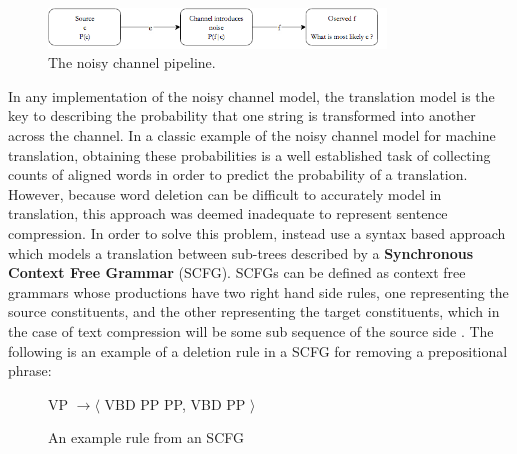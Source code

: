 \begin{figure}[H]
\centering
\includegraphics[width=0.8\textwidth]{noisyCh.png}
\caption{The noisy channel pipeline.}
\label{fig:channel}
\end{figure}


{In any implementation of the noisy channel model, the translation model is the key to describing the probability that one string is transformed into another across the channel.  In a classic example of the noisy channel model for machine translation, obtaining these probabilities is a well established task of collecting counts of aligned words in order to predict the probability of a translation.  However, because word deletion can be difficult to accurately model in  translation, this approach was deemed inadequate to represent sentence compression.  In order to solve this problem, \citet{knight2000statistics} instead use a syntax based approach which models a translation between sub-trees described by a \textbf{Synchronous Context Free Grammar} (SCFG).  SCFGs can be defined as context free grammars whose productions have two right hand side rules, one representing the source constituents, and the other representing the target constituents, which in the case of text compression will be some sub sequence of the source side \citep{galley2007lexicalized}. The following is an example of a deletion rule in a SCFG for removing a prepositional phrase:}

\begin{figure}[H]
\centering
VP $ \rightarrow  \langle$ VBD PP PP, VBD PP $\rangle$
\caption{An example rule from an SCFG}
\label{fig:scfg}
\end{figure}

